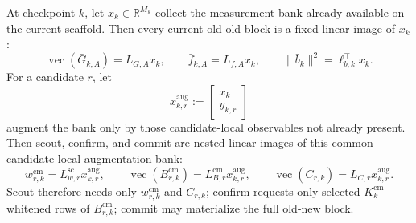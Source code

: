\documentclass[11pt]{article}
\begin{document}
At checkpoint \(k\), let \(x_k\in\mathbb R^{M_k}\) collect the measurement bank already available on the current scaffold. Then every current old-old block is a fixed linear image of \(x_k\):
\[
\operatorname{vec}(\bar G_{k,A})=L_{G,A}x_k,
\qquad
\bar f_{k,A}=L_{f,A}x_k,
\qquad
\|\bar b_k\|^2=\ell_{b,k}^\top x_k.
\]
For a candidate \(r\), let
\[
x_{k,r}^{\mathrm{aug}}
:=
\begin{bmatrix}
x_k\\
y_{k,r}
\end{bmatrix}
\]
augment the bank only by those candidate-local observables not already present. Then scout, confirm, and commit are nested linear images of this common candidate-local augmentation bank:
\[
w_{r,k}^{\mathrm{cm}}=L_{w,r}^{\mathrm{sc}}x_{k,r}^{\mathrm{aug}},
\qquad
\operatorname{vec}(B_{r,k}^{\mathrm{cm}})=L_{B,r}^{\mathrm{cm}}x_{k,r}^{\mathrm{aug}},
\qquad
\operatorname{vec}(C_{r,k})=L_{C,r}x_{k,r}^{\mathrm{aug}}.
\]
Scout therefore needs only \(w_{r,k}^{\mathrm{cm}}\) and \(C_{r,k}\); confirm requests only selected \(K_k^{\mathrm{cm}}\)-whitened rows of \(B_{r,k}^{\mathrm{cm}}\); commit may materialize the full old-new block.
\end{document}
